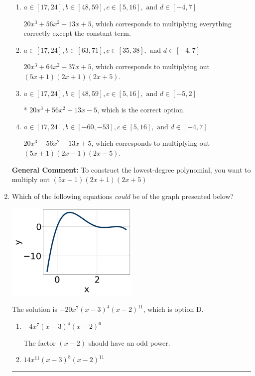 \documentclass{extbook}[14pt]
\newcommand{\litem}[1]{\item #1

\rule{\textwidth}{0.4pt}}
\begin{document}
\begin{enumerate}
{\begin{enumerate}[label=\Alph*.]
$20x^{3} +44 x^{2} -17 x -5$, which corresponds to multiplying out $(5x + 1)(2x -1)(2x + 5)$.
\item \( a \in [17, 24], b \in [48, 59], c \in [5, 16], \text{ and } d \in [-4, 7] \)

$20x^{3} +56 x^{2} +13 x + 5$, which corresponds to multiplying everything correctly except the constant term.
\item \( a \in [17, 24], b \in [63, 71], c \in [35, 38], \text{ and } d \in [-4, 7] \)

$20x^{3} +64 x^{2} +37 x + 5$, which corresponds to multiplying out $(5x + 1)(2x + 1)(2x + 5)$.
\item \( a \in [17, 24], b \in [48, 59], c \in [5, 16], \text{ and } d \in [-5, 2] \)

* $20x^{3} +56 x^{2} +13 x -5$, which is the correct option.
\item \( a \in [17, 24], b \in [-60, -53], c \in [5, 16], \text{ and } d \in [-4, 7] \)

$20x^{3} -56 x^{2} +13 x + 5$, which corresponds to multiplying out $(5x + 1)(2x -1)(2x -5)$.
\end{enumerate}

\textbf{General Comment:} To construct the lowest-degree polynomial, you want to multiply out $(5x -1)(2x + 1)(2x + 5)$
}
\litem{
Which of the following equations \textit{could} be of the graph presented below?

\begin{center}
    \includegraphics[width=0.5\textwidth]{../Figures/polyGraphToFunctionB.png}
\end{center}




The solution is \( -20x^{7} (x - 3)^{4} (x - 2)^{11} \), which is option D.\begin{enumerate}[label=\Alph*.]
\item \( -4x^{7} (x - 3)^{4} (x - 2)^{6} \)

The factor $(x - 2)$ should have an odd power.
\item \( 14x^{11} (x - 3)^{8} (x - 2)^{11} \)


\end{enumerate}}
\end{enumerate}
\end{document}
